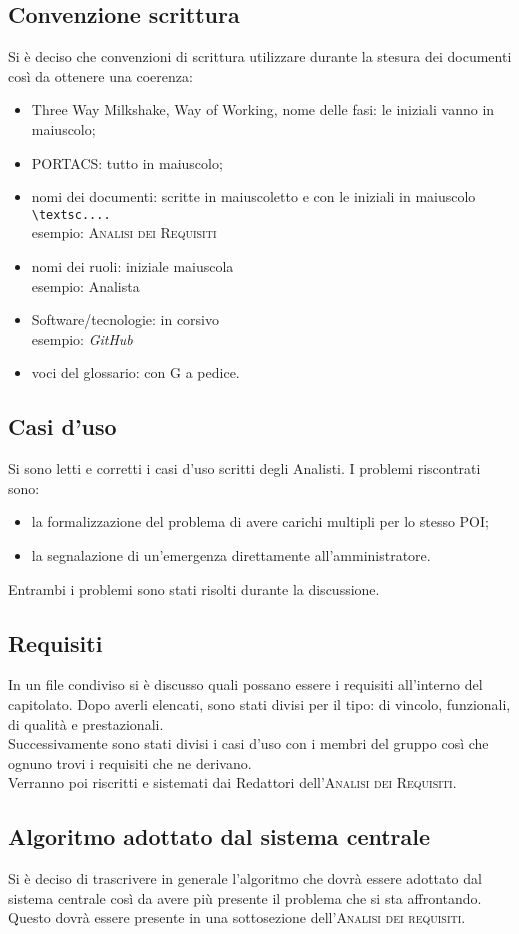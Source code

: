 \subsection{Convenzione scrittura}
Si è deciso che convenzioni di scrittura utilizzare durante la stesura dei documenti così da ottenere una coerenza:
\begin{itemize}
\item Three Way Milkshake, Way of Working, nome delle fasi: le iniziali vanno in maiuscolo;
\item PORTACS: tutto in maiuscolo;
\item nomi dei documenti: scritte in maiuscoletto e con le iniziali in maiuscolo \texttt{\textbackslash textsc{....}} \\esempio: \textsc{Analisi dei Requisiti}
\item nomi dei ruoli: iniziale maiuscola 
\\esempio: Analista
\item Software/tecnologie: in corsivo 
\\esempio: \textit{GitHub}
\item voci del glossario: con G a pedice.
\end{itemize}

\subsection{Casi d'uso}
Si sono letti e corretti i casi d'uso scritti degli Analisti. I problemi riscontrati sono:
\begin{itemize}
	\item la formalizzazione del problema di avere carichi multipli per lo stesso POI;
	\item la segnalazione di un'emergenza direttamente all'amministratore.
\end{itemize}
Entrambi i problemi sono stati risolti durante la discussione.

\subsection{Requisiti}
In un file condiviso si è discusso quali possano essere i requisiti all'interno del capitolato. Dopo averli elencati, sono stati divisi per il tipo: di vincolo, funzionali, di qualità e prestazionali. \\Successivamente sono stati divisi i casi d'uso con i membri del gruppo così che ognuno trovi i requisiti che ne derivano. \\Verranno poi riscritti e sistemati dai Redattori dell'\textsc{Analisi dei Requisiti}.

\subsection{Algoritmo adottato dal sistema centrale}
Si è deciso di trascrivere in generale l'algoritmo che dovrà essere adottato dal sistema centrale così da avere più presente il problema che si sta affrontando. Questo dovrà essere presente in una sottosezione dell'\textsc{Analisi dei requisiti}. 
